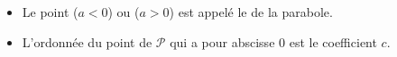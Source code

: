 \begin{Remarque}
    \begin{itemize}
        \item Le point  ($a<0$) ou  ($a>0$) est appelé le de la parabole. 
        \item L'ordonnée du point de $\mathcal{P}$ qui a pour abscisse 0 est le coefficient $c$.
    \end{itemize}
\end{Remarque}